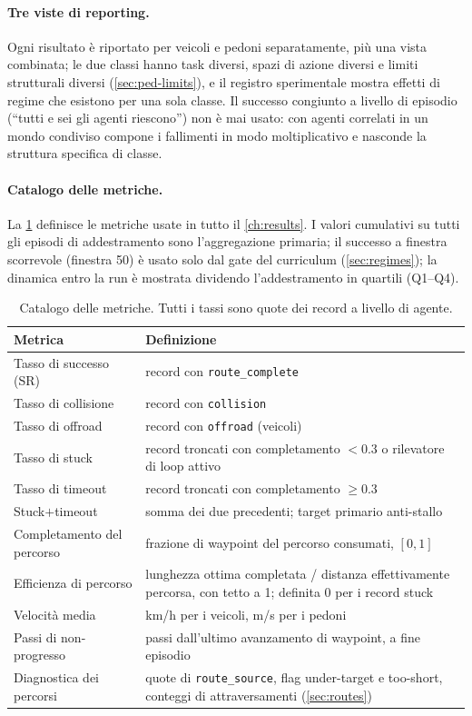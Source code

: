 \paragraph{Tre viste di reporting.}
Ogni risultato è riportato per veicoli e pedoni separatamente, più una
vista combinata; le due classi hanno task diversi, spazi di azione
diversi e limiti strutturali diversi (\cref{sec:ped-limits}), e il
registro sperimentale mostra effetti di regime che esistono per una sola
classe. Il successo congiunto a livello di episodio (``tutti e sei gli
agenti riescono'') non è mai usato: con agenti correlati in un mondo
condiviso compone i fallimenti in modo moltiplicativo e nasconde la
struttura specifica di classe.

\paragraph{Catalogo delle metriche.}
La \cref{tab:metrics} definisce le metriche usate in tutto il
\cref{ch:results}. I valori cumulativi su tutti gli episodi di
addestramento sono l'aggregazione primaria; il successo a finestra
scorrevole (finestra 50) è usato solo dal gate del curriculum
(\cref{sec:regimes}); la dinamica entro la run è mostrata dividendo
l'addestramento in quartili (Q1--Q4).

\begin{table}[t]
  \centering\small
  \caption{Catalogo delle metriche. Tutti i tassi sono quote dei record
  a livello di agente.}
  \label{tab:metrics}
  \begin{tabular}{@{}p{3.6cm}p{9.6cm}@{}}
    \toprule
    Metrica & Definizione \\
    \midrule
    Tasso di successo (SR) & record con \texttt{route\_complete} \\
    Tasso di collisione & record con \texttt{collision} \\
    Tasso di offroad & record con \texttt{offroad} (veicoli) \\
    Tasso di stuck & record troncati con completamento $< 0.3$ o rilevatore di loop attivo \\
    Tasso di timeout & record troncati con completamento $\geq 0.3$ \\
    Stuck$+$timeout & somma dei due precedenti; target primario anti-stallo \\
    Completamento del percorso & frazione di waypoint del percorso consumati, $[0,1]$ \\
    Efficienza di percorso & lunghezza ottima completata / distanza effettivamente percorsa, con tetto a 1; definita 0 per i record stuck \\
    Velocità media & km/h per i veicoli, m/s per i pedoni \\
    Passi di non-progresso & passi dall'ultimo avanzamento di waypoint, a fine episodio \\
    Diagnostica dei percorsi & quote di \texttt{route\_source}, flag under-target e too-short, conteggi di attraversamenti (\cref{sec:routes}) \\
    \bottomrule
  \end{tabular}
\end{table}

